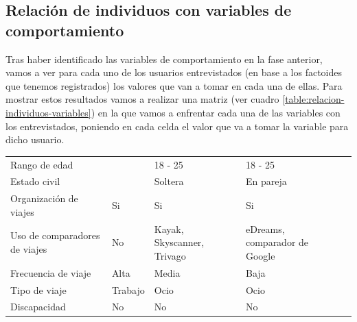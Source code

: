 \subsection{Relación de individuos con variables de comportamiento}
Tras haber identificado las variables de comportamiento en la fase anterior, vamos a ver para cada uno de los usuarios entrevistados (en base a los factoides
que tenemos registrados) los valores que van a tomar en cada una de ellas. Para mostrar estos resultados vamos a realizar una matriz (ver cuadro \ref{table:relacion-individuos-variables})
en la que vamos a enfrentar cada una de las variables con los entrevistados, poniendo en cada celda el valor que va a tomar la variable para dicho usuario.
\begin{table}[H]
    \centering
    \begin{tabular}{|p{10em}|p{7em}|p{7em}|p{7em}|p{8em}|}
        \hline
        \cellcolor{black}                 & \cellcolor{black}{\textcolor{white}{Madi}}  & \cellcolor{black}{\textcolor{white}{Sofía}}   & \cellcolor{black}{\textcolor{white}{Beatriz}} \\ \hline
        Rango de edad                     &                                             & 18 - 25                                       & 18 - 25                                       \\ \hline
        Estado civil                      &                                             & Soltera                                       & En pareja                                     \\ \hline
        Organización de viajes            & Si                                          & Si                                            & Si                                            \\ \hline
        Uso de comparadores de viajes     & No                                          & Kayak, Skyscanner, Trivago                    & eDreams, comparador de Google                 \\ \hline
        Frecuencia de viaje               & Alta                                        & Media                                         & Baja                                          \\ \hline
        Tipo de viaje                     & Trabajo                                     & Ocio                                          & Ocio                                          \\ \hline
        Discapacidad                      & No                                          & No                                            & No                                            \\ \hline

\end{tabular}
\end{table}
